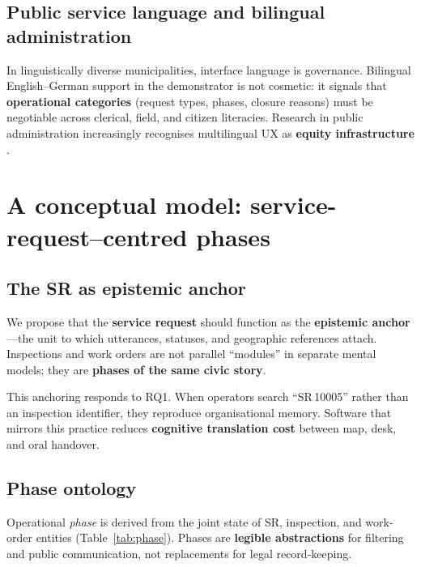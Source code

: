 \documentclass[12pt,a4paper]{article}
\begin{document}
\subsection{Public service language and bilingual administration}

In linguistically diverse municipalities, interface language is governance. Bilingual English--German support in the demonstrator is not cosmetic: it signals that \textbf{operational categories} (request types, phases, closure reasons) must be negotiable across clerical, field, and citizen literacies. Research in public administration increasingly recognises multilingual UX as \textbf{equity infrastructure} \cite{rubio2019}.

\section{A conceptual model: service-request--centred phases}
\label{sec:model}

\subsection{The SR as epistemic anchor}

We propose that the \textbf{service request} should function as the \textbf{epistemic anchor}---the unit to which utterances, statuses, and geographic references attach. Inspections and work orders are not parallel ``modules'' in separate mental models; they are \textbf{phases of the same civic story}.

This anchoring responds to RQ1. When operators search ``SR\,10005'' rather than an inspection identifier, they reproduce organisational memory. Software that mirrors this practice reduces \textbf{cognitive translation cost} between map, desk, and oral handover.

\subsection{Phase ontology}

Operational \emph{phase} is derived from the joint state of SR, inspection, and work-order entities (Table~\ref{tab:phase}). Phases are \textbf{legible abstractions} for filtering and public communication, not replacements for legal record-keeping.
\end{document}
